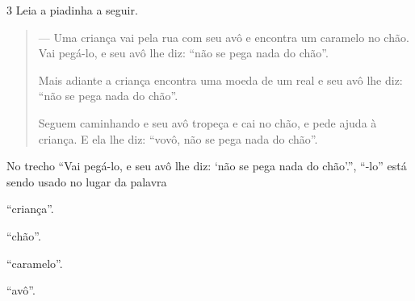 \num{3} Leia a piadinha a seguir.

\begin{quote}
--- Uma criança vai pela rua com seu avô e encontra um caramelo no chão.
Vai pegá-lo, e seu avô lhe diz: ``não se pega nada do chão''.

Mais adiante a criança encontra uma moeda de um real e seu avô lhe diz:
``não se pega nada do chão''.

Seguem caminhando e seu avô tropeça e cai no chão, e pede ajuda à
criança. E ela lhe diz: ``vovô, não se pega nada do chão''.
\end{quote}


No trecho ``Vai pegá-lo, e seu avô lhe diz: `não se pega nada do
chão'.'', ``-lo'' está sendo usado no lugar da palavra

\begin{escolha}
\item ``criança''.

\item ``chão''.

\item ``caramelo''.

\item ``avô''.
\end{escolha}

